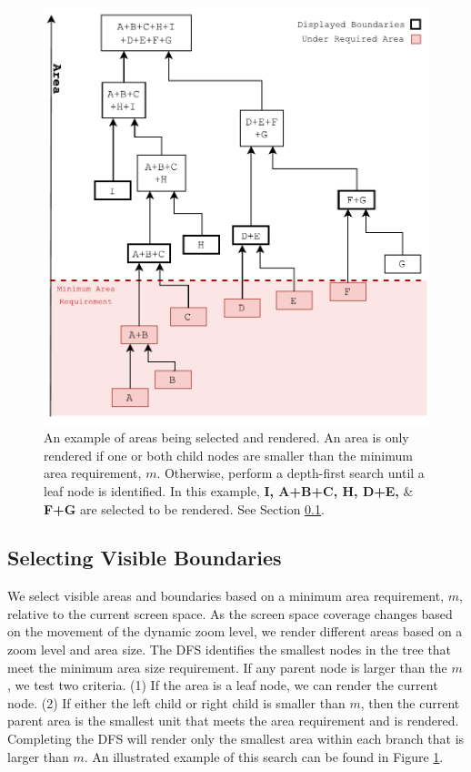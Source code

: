 \begin{figure}[ht]
\centering
\includegraphics[width=0.7\linewidth]{images/displayBoundaries}
\caption{An example of areas being selected and rendered. An area is only rendered if one or both child nodes are smaller than the minimum area requirement, $m$. Otherwise, perform a depth-first search until  a leaf node is identified. In this example, \textbf{I, A+B+C, H, D+E,} \& \textbf{F+G} are selected to be rendered. See Section \ref{visible}. } \vspace{-0.2cm} \label{fig:display}
\end{figure}

\subsection{Selecting Visible Boundaries} \label{visible}
We select visible areas and boundaries based on a minimum area requirement, $m$, relative to the current screen space. As the screen space coverage changes based on the movement of the dynamic zoom level, we render different areas based on a zoom level and area size. The DFS identifies the smallest nodes in the tree that meet the minimum area size requirement. If any parent node is larger than the $m$, we test two criteria. (1) If the area is a leaf node, we can render the current node. (2) If either the left child or right child is smaller than $m$, then the current parent area is the smallest unit that meets the area requirement and is rendered. Completing the DFS will render only the smallest area within each branch that is larger than $m$. An illustrated example of this search can be found in Figure \ref{fig:display}. 

